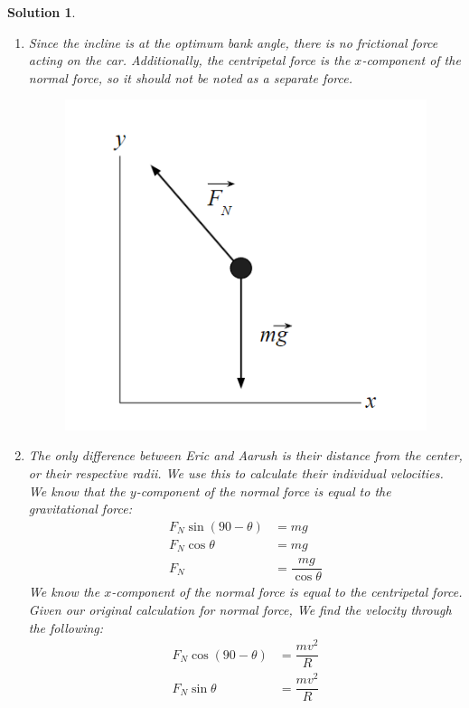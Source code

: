 \documentclass[12pt]{article}
\newtheorem*{solution}{Solution}
\theoremstyle{mystyle}
\begin{document}
\begin{solution}
    \begin{enumerate}[label=\alph*)]
        \item Since the incline is at the optimum bank angle, there is no frictional force acting on the car. Additionally, the centripetal force is the $x$-component of the normal force, so it should not be noted as a separate force.
        \begin{figure}[H]
            \centering
            \includegraphics[scale=0.7]{BankFBD.png}
        \end{figure}
        \item 
        The only difference between Eric and Aarush is their distance from the center, or their respective radii. We use this to calculate their individual velocities. We know that the $y$-component of the normal force is equal to the gravitational force:
        \begin{align*}
            F_N\sin(90-\theta)&=mg\\
            F_N\cos\theta&=mg\\
            F_N&=\dfrac{mg}{\cos\theta}
        \end{align*}
        We know the $x$-component of the normal force is equal to the centripetal force. Given our original calculation for normal force, We find the velocity through the following:
        \begin{align*}
            F_N\cos(90-\theta)&=\dfrac{mv^2}{R}\\
            F_N\sin\theta&=\dfrac{mv^2}{R}\\

\end{align*}
\end{enumerate}
\end{solution}
\end{document}
